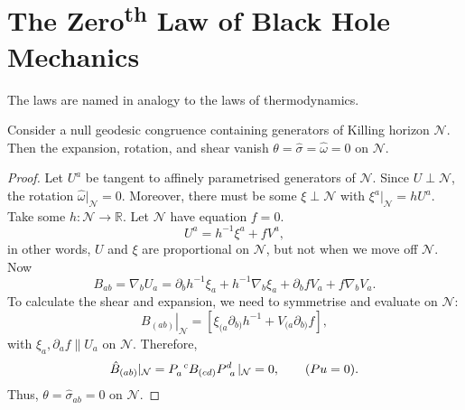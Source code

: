 \section{The \texorpdfstring{Zero\textsuperscript{th}}{Zeroth} Law of Black Hole Mechanics}%
\label{sec:the_zeroth_law_of_black_hole_mechanics}

The laws are named in analogy to the laws of thermodynamics.

\begin{claim}
  Consider a null geodesic congruence containing generators of Killing horizon $\mathcal{N}$.
  Then the expansion, rotation, and shear vanish $\theta = \hat{\sigma} = \hat{\omega} = 0$ on $\mathcal{N}$.
\end{claim}
\begin{proof}
  Let $U^{a}$ be tangent to affinely parametrised generators of $\mathcal{N}$.
  Since $U \perp \mathcal{N}$, the rotation $\hat{\omega}\rvert_{\mathcal{N}} = 0$.
  Moreover, there must be some $\xi \perp \mathcal{N}$ with $\xi^{a} \rvert_\mathcal{N} = h U^{a}$.
  Take some $h \colon \mathcal{N} \to \mathbb{R}$. Let $\mathcal{N}$ have equation $f = 0$.
  \begin{equation}
    U^{a} = h^{-1} \xi^{a} + f V^{a},
  \end{equation}
  in other words, $U$ and $\xi$ are proportional on $\mathcal{N}$, but not when we move off $\mathcal{N}$.
  Now 
  \begin{equation}
    B_{ab} = \nabla_{b} U_{a} = \partial_{b} h^{-1} \xi_{a} + h^{-1} \nabla_{b} \xi_{a} + \partial_{b} f V_{a} + f \nabla_{b} V_{a}.
  \end{equation}
  To calculate the shear and expansion, we need to symmetrise and evaluate on $\mathcal{N}$:
  \begin{equation}
    \left. B_{(ab)} \right\rvert_\mathcal{N} = \left[ \xi_{(a} \partial_{b)} h^{-1} + V_{(a} \partial_{b)} f \right],
  \end{equation}
  with $\xi_{a} , \partial_{a} f \parallel U_{a}$ on $\mathcal{N}$.
  Therefore, 
  \begin{equation}
    \hat{B}_{(ab)} \rvert_\mathcal{N} = P\indices{_{a}^{c}} B_{(cd)} P\indices{^{d}_{a}} \rvert_\mathcal{N} = 0, \qquad (P u = 0).
  \end{equation}
  Thus, $\theta = \hat{\sigma}_{ab} = 0$ on $\mathcal{N}$.
\end{proof}

